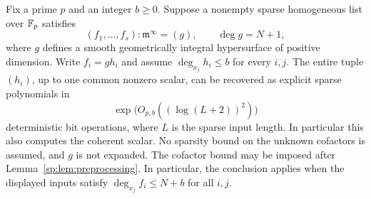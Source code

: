 \begin{theorem}
\label{sp:thm:individual-cofactors}
Fix a prime $p$ and an integer $b\geq0$. Suppose a nonempty sparse
homogeneous list over $\mathbb F_p$ satisfies
\[
 (f_1,\ldots,f_s):\mathfrak m^\infty=(g),\qquad
 \deg g=N+1,
\]
where $g$ defines a smooth geometrically integral hypersurface of positive
dimension. Write $f_i=g h_i$ and assume
$\deg_{x_j}h_i\leq b$ for every $i,j$.
The entire tuple $(h_i)$, up to one common nonzero scalar, can be
recovered as explicit sparse polynomials in
\[
 \exp\bigl(O_{p,b}((\log(L+2))^2)\bigr)
\]
deterministic bit operations, where $L$ is the sparse input length.
In particular this also computes the coherent scalar. No sparsity bound
on the unknown cofactors is assumed, and $g$ is not expanded. The
cofactor bound may be imposed after
Lemma~\ref{sp:lem:preprocessing}.
In particular, the conclusion applies when the displayed inputs satisfy
$\deg_{x_j}f_i\leq N+b$ for all $i,j$.
\end{theorem}
